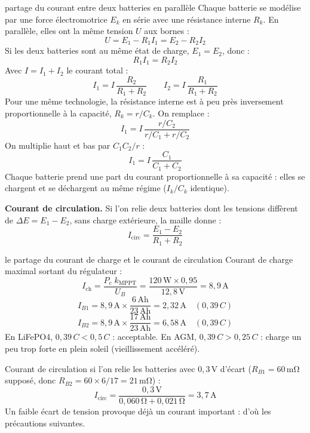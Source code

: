 \documentclass[11pt,a4paper]{article}
\newcommand{\U}[1]{\,\mathrm{#1}}
\begin{document}
\begin{demo}{partage du courant entre deux batteries en parallèle}
Chaque batterie se modélise par une force électromotrice $E_k$ en série avec une résistance interne $R_k$. En parallèle, elles ont la même tension $U$ aux bornes :
\[
U = E_1 - R_1 I_1 = E_2 - R_2 I_2
\]
Si les deux batteries sont au même état de charge, $E_1 = E_2$, donc :
\[
R_1 I_1 = R_2 I_2
\]
Avec $I = I_1 + I_2$ le courant total :
\[
I_1 = I \, \frac{R_2}{R_1 + R_2}
\qquad
I_2 = I \, \frac{R_1}{R_1 + R_2}
\]
Pour une même technologie, la résistance interne est à peu près inversement proportionnelle à la capacité, $R_k = r / C_k$. On remplace :
\[
I_1 = I \, \frac{r/C_2}{r/C_1 + r/C_2}
\]
On multiplie haut et bas par $C_1 C_2 / r$ :
\[
I_1 = I \, \frac{C_1}{C_1 + C_2}
\]
Chaque batterie prend une part du courant proportionnelle à sa capacité : elles se chargent et se déchargent au même régime ($I_k / C_k$ identique).

\textbf{Courant de circulation.} Si l'on relie deux batteries dont les tensions diffèrent de $\Delta E = E_1 - E_2$, sans charge extérieure, la maille donne :
\[
I_{\text{circ}} = \frac{E_1 - E_2}{R_1 + R_2}
\]
\end{demo}

\begin{calcul}{le partage du courant de charge et le courant de circulation}
Courant de charge maximal sortant du régulateur :
\[
I_{\text{ch}} = \frac{P_c \; k_{\text{MPPT}}}{U_B} = \frac{120\U{W} \times 0{,}95}{12{,}8\U{V}} = 8{,}9\U{A}
\]
\[
I_{B1} = 8{,}9\U{A} \times \frac{6\U{Ah}}{23\U{Ah}} = 2{,}32\U{A} \quad (0{,}39\,C)
\]
\[
I_{B2} = 8{,}9\U{A} \times \frac{17\U{Ah}}{23\U{Ah}} = 6{,}58\U{A} \quad (0{,}39\,C)
\]
En LiFePO4, $0{,}39\,C < 0{,}5\,C$ : acceptable. En AGM, $0{,}39\,C > 0{,}25\,C$ : charge un peu trop forte en plein soleil (vieillissement accéléré).

Courant de circulation si l'on relie les batteries avec $0{,}3\U{V}$ d'écart ($R_{B1} = 60\U{m\Omega}$ supposé, donc $R_{B2} = 60 \times 6/17 = 21\U{m\Omega}$) :
\[
I_{\text{circ}} = \frac{0{,}3\U{V}}{0{,}060\U{\Omega} + 0{,}021\U{\Omega}} = 3{,}7\U{A}
\]
Un faible écart de tension provoque déjà un courant important : d'où les précautions suivantes.
\end{calcul}
\end{document}
